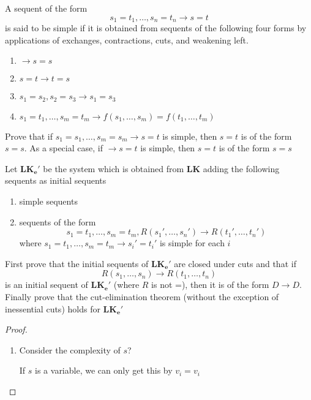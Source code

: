 \documentclass[11pt]{article}
\def \LK {\textbf{LK}}
\def \LKe {\textbf{LK}_\textbf{e}}
\begin{document}
\begin{exercise}
\label{ex7.7}
A sequent of the form
\begin{equation*}
s_1=t_1,\dots,s_n=t_n\to s=t
\end{equation*}
is said to be simple if it is obtained from sequents of the following four forms by applications
of exchanges, contractions, cuts, and weakening left.
\begin{enumerate}
\item \(\to s=s\)
\item \(s=t\to t=s\)
\item \(s_1=s_2,s_2=s_3\to s_1=s_3\)
\item \(s_1=t_1,\dots,s_m=t_m\to f(s_1,\dots,s_m)=f(t_1,\dots,t_m)\)
\end{enumerate}


Prove that if \(s_1=s_1,\dots,s_m=s_m\to s=t\) is simple, then \(s=t\) is of the form \(s=s\). As
a special case, if \(\to s=t\) is simple, then \(s=t\) is of the form \(s=s\)

Let \(\LKe'\) be the system which is obtained from \(\LK\) adding the following sequents as
initial sequents
\begin{enumerate}
\item simple sequents
\item sequents of the form
\begin{equation*}
s_1=t_1,\dots,s_m=t_m,R(s_1',\dots,s_n')\to R(t_1',\dots,t_n')
\end{equation*}
where \(s_1=t_1,\dots,s_m=t_m\to s_i'=t_i'\) is simple for each \(i\)
\end{enumerate}


First prove that the initial sequents of \(\LKe'\) are closed under cuts and that if
\begin{equation*}
R(s_1,\dots,s_n)\to R(t_1,\dots,t_n)
\end{equation*}
is an initial sequent of \(\LKe'\) (where \(R\) is not =), then it is of the form \(D\to D\).
Finally prove that the cut-elimination theorem (without the exception of inessential cuts)
holds for \(\LKe'\)
\end{exercise}

\begin{proof}
\begin{enumerate}
\item Consider the complexity of \(s\)?

If \(s\) is a variable, we can only get this by \(v_i=v_i\)
\end{enumerate}
\end{proof}
\end{document}
